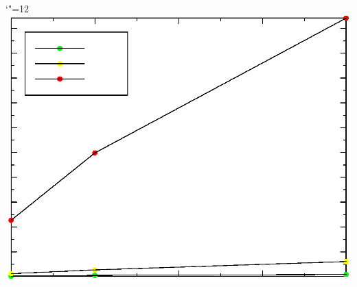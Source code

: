 \documentclass[12pt]{article}
\begin{document}
\makeatletter%
\let\ASYencoding\f@encoding%
\let\ASYfamily\f@family%
\let\ASYseries\f@series%
\let\ASYshape\f@shape%
\makeatother%
{\catcode`"=12%
\includegraphics[bb=-402.112559 -150.000000 -1.000000 150.000000]{figure-4-1_0.eps}%
}%
\kern -402.616732pt%
%
\end{document}
